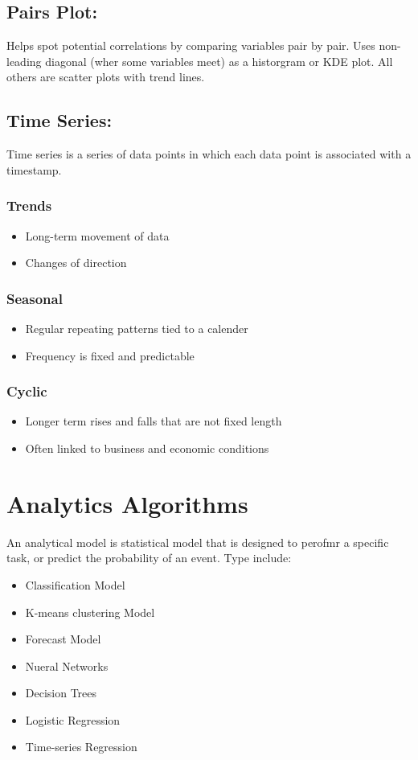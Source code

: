 \documentclass[a5paper]{article}
\begin{document}
	\subsection{Pairs Plot:}
	Helps spot potential correlations by comparing variables pair by pair. Uses non-leading diagonal (wher some variables meet) as a historgram or KDE plot. All others are scatter plots with trend lines.
	\subsection{Time Series:}
	Time series is a series of data points in which each data point is associated with a timestamp.
	\subsubsection{Trends}
	\begin{itemize}
		\item Long-term movement of data
		\item Changes of direction
	\end{itemize}
	\subsubsection{Seasonal}
	\begin{itemize}
		\item Regular repeating patterns tied to a calender
		\item Frequency is fixed and predictable
	\end{itemize}
	\subsubsection{Cyclic}
	\begin{itemize}
		\item Longer term rises and falls that are not fixed length
		\item Often linked to business and economic conditions
	\end{itemize}

	\section{Analytics Algorithms}
	An analytical model is statistical model that is designed to perofmr a specific task, or predict the probability of an event. Type include:
	\begin{itemize}
		\item Classification Model
		\item K-means clustering Model
		\item Forecast Model
		\item Nueral Networks
		\item Decision Trees
		\item Logistic Regression
		\item Time-series Regression
	\end{itemize}
\end{document}
